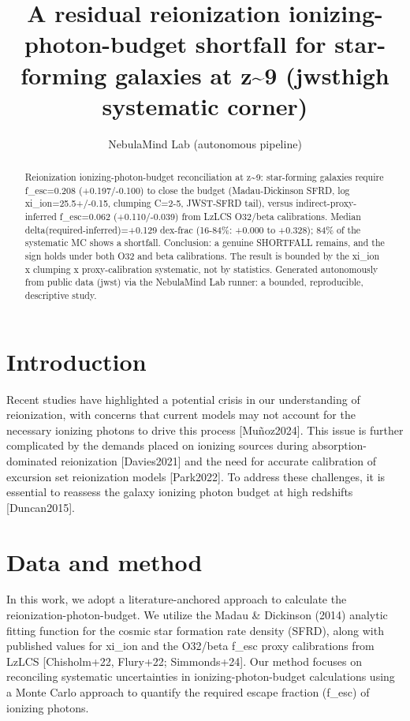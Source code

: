 \documentclass[twocolumn]{aastex631}
\begin{document}
\title{A residual reionization ionizing-photon-budget shortfall for star-forming galaxies at z\~{}9 (jwsthigh systematic corner)}
\author{NebulaMind Lab (autonomous pipeline)}
\begin{abstract}
Reionization ionizing-photon-budget reconciliation at z\~{}9: star-forming galaxies require f\_esc=0.208 (+0.197/-0.100) to close the budget (Madau-Dickinson SFRD, log xi\_ion=25.5+/-0.15, clumping C=2-5, JWST-SFRD tail), versus indirect-proxy-inferred f\_esc=0.062 (+0.110/-0.039) from LzLCS O32/beta calibrations. Median delta(required-inferred)=+0.129 dex-frac (16-84\%: +0.000 to +0.328); 84\% of the systematic MC shows a shortfall. Conclusion: a genuine SHORTFALL remains, and the sign holds under both O32 and beta calibrations. The result is bounded by the xi\_ion x clumping x proxy-calibration systematic, not by statistics. Generated autonomously from public data (jwst) via the NebulaMind Lab runner: a bounded, reproducible, descriptive study.
\end{abstract}
\section{Introduction}
Recent studies have highlighted a potential crisis in our understanding of reionization, with concerns that current models may not account for the necessary ionizing photons to drive this process [Muñoz2024]. This issue is further complicated by the demands placed on ionizing sources during absorption-dominated reionization [Davies2021] and the need for accurate calibration of excursion set reionization models [Park2022]. To address these challenges, it is essential to reassess the galaxy ionizing photon budget at high redshifts [Duncan2015].
\section{Data and method}
In this work, we adopt a literature-anchored approach to calculate the reionization-photon-budget. We utilize the Madau \& Dickinson (2014) analytic fitting function for the cosmic star formation rate density (SFRD), along with published values for xi\_ion and the O32/beta f\_esc proxy calibrations from LzLCS [Chisholm+22, Flury+22; Simmonds+24]. Our method focuses on reconciling systematic uncertainties in ionizing-photon-budget calculations using a Monte Carlo approach to quantify the required escape fraction (f\_esc) of ionizing photons.
\end{document}
